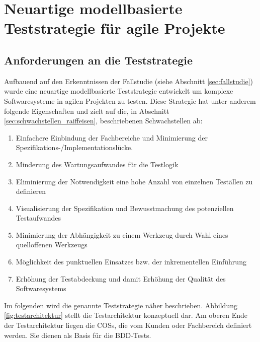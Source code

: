 \chapter{Neuartige modellbasierte Teststrategie für agile Projekte}
\label{sec:results}
\section{Anforderungen an die Teststrategie}
\label{sec:anforderungen_teststrategie}
Aufbauend auf den Erkenntnissen der Fallstudie (siehe Abschnitt \ref{sec:fallstudie}) wurde eine neuartige modellbasierte Teststrategie entwickelt um komplexe Softwaresysteme in agilen Projekten zu testen. Diese Strategie hat unter anderem folgende Eigenschaften und zielt auf die, in Abschnitt \ref{sec:schwachstellen_raiffeisen}, beschriebenen Schwachstellen ab:

\begin{enumerate}
\item Einfachere Einbindung der Fachbereiche und Minimierung der Spezifikations-/Implementationslücke.
\item Minderung des Wartungsaufwandes für die Testlogik
\item Eliminierung der Notwendigkeit eine hohe Anzahl von einzelnen Teställen zu definieren
\item Visualisierung der Spezifikation und Bewusstmachung des potenziellen Testaufwandes
\item Minimierung der Abhängigkeit zu einem Werkzeug durch Wahl eines quelloffenen Werkzeugs
\item Möglichkeit des punktuellen Einsatzes bzw. der inkrementellen Einführung
\item Erhöhung der Testabdeckung und damit Erhöhung der Qualität des Softwaresystems
\end{enumerate}

Im folgenden wird die genannte Teststrategie näher beschrieben. Abbildung \ref{fig:testarchitektur} stellt die Testarchitektur konzeptuell dar. Am oberen Ende der Testarchitektur liegen die \glspl{COS}, die vom Kunden oder Fachbereich definiert werden. Sie dienen als Basis für die BDD-Tests. 

